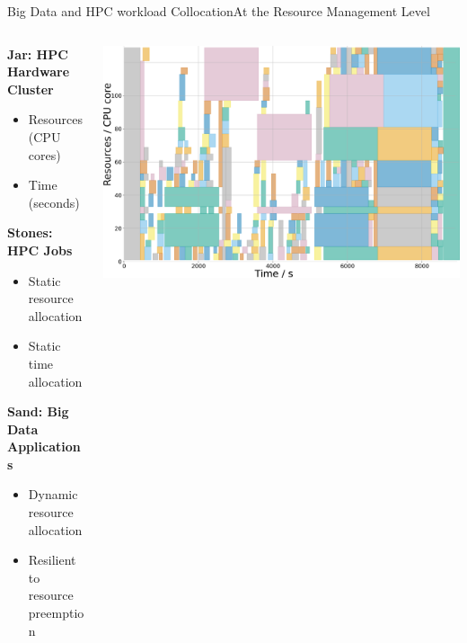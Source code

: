 \documentclass[10pt, compress, titleprogressbar, aspectratio=169]{beamer}
\begin{document}
        \begin{frame}{Big Data and HPC workload Collocation}{At the Resource Management Level}
            \begin{columns}
                \begin{column}[c]{0.4\textwidth}
                    \textbf{Jar: HPC Hardware Cluster}
                    \begin{itemize}
                        \item Resources (CPU cores)
                        \item Time (seconds)
                    \end{itemize}
                    \textbf{Stones: HPC Jobs}
                    \begin{itemize}
                        \item Static resource allocation
                        \item Static time allocation
                    \end{itemize}
                    \pause
                    \begin{block}{\textbf{Sand: Big Data Applications}}
                        \begin{itemize}
                            \item Dynamic resource allocation
                            \item Resilient to resource preemption
                        \end{itemize}
                    \end{block}
                \end{column}
                \begin{column}{0.6\textwidth}
                    \begin{center}
                        \includegraphics[width=\linewidth,height=\textheight,keepaspectratio]{./img/gantt_small.png}
                    \end{center}
                \end{column}
            \end{columns}
        \end{frame}
\end{document}
